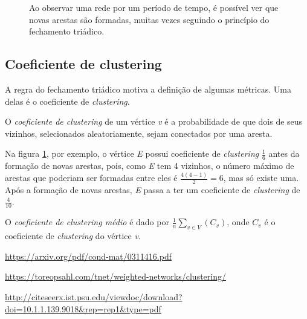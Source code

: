\begin{figure}[H]
    \center
    \qquad

    \caption{Ao observar uma rede por um período de tempo, é possível ver que novas arestas são formadas, muitas vezes seguindo o princípio do fechamento triádico.}
    \label{fig:grafo-fechamento-triadico}
\end{figure}

\subsection{Coeficiente de clustering}
\label{conceitos__fechamento-triadico--coeficiente-clustering}

A regra do fechamento triádico motiva a definição de algumas métricas. Uma delas é o coeficiente de \emph{clustering}.

O \emph{coeficiente de clustering} de um vértice \emph{v} é a probabilidade de que dois de seus vizinhos, selecionados aleatoriamente, sejam conectados por uma aresta.

Na figura \ref{fig:grafo-fechamento-triadico}, por exemplo, o vértice \emph{E} possui coeficiente de \emph{clustering} $\frac{1}{6}$ antes da formação de novas arestas, pois, como \emph{E} tem 4 vizinhos, o número máximo de arestas que poderiam ser formadas entre eles é $\frac{4(4 - 1)}{2} = 6$, mas só existe uma. Após a formação de novas arestas, \emph{E} passa a ter um coeficiente de \emph{clustering} de $\frac{4}{10}$.

O \emph{coeficiente de clustering médio} é dado por $\frac{1}{n}\sum_{v\in V}(C_{v})$, onde $C_{v}$ é o coeficiente de \emph{clustering} do vértice \emph{v}.



\url{https://arxiv.org/pdf/cond-mat/0311416.pdf}

\url{https://toreopsahl.com/tnet/weighted-networks/clustering/}

\url{http://citeseerx.ist.psu.edu/viewdoc/download?doi=10.1.1.139.9018&rep=rep1&type=pdf}

